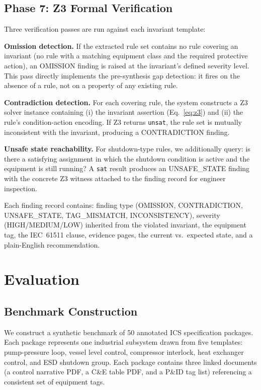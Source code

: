 \documentclass[conference]{IEEEtran}
\begin{document}
\subsection{Phase 7: Z3 Formal Verification}
Three verification passes are run against each invariant template:

\textbf{Omission detection.} If the extracted rule set contains no rule
covering an invariant (no rule with a matching equipment class and the
required protective action), an OMISSION finding is raised at the invariant's
defined severity level. This pass directly implements the pre-synthesis gap
detection: it fires on the absence of a rule, not on a property of any
existing rule.

\textbf{Contradiction detection.} For each covering rule, the system
constructs a Z3 solver instance containing (i) the invariant assertion
(Eq.~\ref{eq:z3}) and (ii) the rule's condition-action encoding. If Z3
returns \texttt{unsat}, the rule set is mutually inconsistent with the
invariant, producing a CONTRADICTION finding.

\textbf{Unsafe state reachability.} For shutdown-type rules, we additionally
query: is there a satisfying assignment in which the shutdown condition is
active and the equipment is still running? A \texttt{sat} result produces
an UNSAFE\_STATE finding with the concrete Z3 witness attached to the finding
record for engineer inspection.

Each finding record contains: finding type (OMISSION, CONTRADICTION,
UNSAFE\_STATE, TAG\_MISMATCH, INCONSISTENCY), severity (HIGH/MEDIUM/LOW)
inherited from the violated invariant, the equipment tag, the IEC~61511
clause, evidence pages, the current vs.\ expected state, and a plain-English
recommendation.

\section{Evaluation}
\label{sec:eval}

\subsection{Benchmark Construction}
We construct a synthetic benchmark of 50 annotated ICS specification
packages. Each package represents one industrial subsystem drawn from five
templates: pump-pressure loop, vessel level control, compressor interlock,
heat exchanger control, and ESD shutdown group. Each package contains three
linked documents (a control narrative PDF, a C\&E table PDF, and a P\&ID
tag list) referencing a consistent set of equipment tags.
\end{document}
